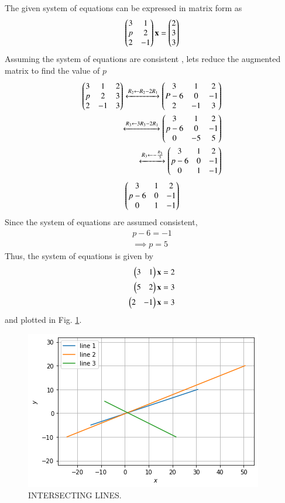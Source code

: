 The given  system of equations can be expressed in matrix form as 
\begin{align}
\begin{pmatrix}3 & 1\\p & 2\\2 & -1\end{pmatrix} \mathbf{x} = \begin{pmatrix}2\\3\\3\end{pmatrix}
\end{align}
%
Assuming the system of equations are consistent , lets reduce the augmented matrix to find the value of $p$
\begin{align}
    \begin{pmatrix}3 & 1 & 2\\p & 2 & 3\\2 &-1 & 3\end{pmatrix} 
\xleftrightarrow {R_2\leftarrow R_2 -2 R_1} \begin{pmatrix}3& 1 & 2\\P-6 & 0 & -1\\2 & -1 &3\end{pmatrix} 
\\
\xleftrightarrow {R_3\leftarrow 3R_3 -2 R_1}\begin{pmatrix}3 & 1 & 2 \\p-6 & 0 & -1\\0 & -5 & 5\end{pmatrix}
\\
\xleftrightarrow {R_3\leftarrow -\frac{R_3}{5}}\begin{pmatrix}3 & 1 & 2 \\p-6 & 0 & -1\\0 & 1& -1\end{pmatrix}
\end{align}
\begin{align}
 \begin{pmatrix}3 & 1 & 2\\p-6 & 0 & -1\\0 & 1 & -1\end{pmatrix} 
\end{align}
%
Since the system of equations are assumed consistent, 
%
\begin{align}
 p-6 = -1
\\
\implies p = 5
\end{align}
Thus, the system of equations is given by 
\begin{align}
 \begin{pmatrix}3 & 1\end{pmatrix}\mathbf{x}&=2 
\\
 \begin{pmatrix}5 & 2 \end{pmatrix}\mathbf{x}&=3 
\\
 \begin{pmatrix}2 & -1\end{pmatrix}\mathbf{x}&=3    
\end{align}
and plotted in Fig.     \ref{linform/20/fig:INTERSECTING LINES.}.
%
\begin{figure}[ht!]
    \centering
    \includegraphics[width=\columnwidth]{solutions/su2021/2/20/FIG-4.png}
    \caption{INTERSECTING LINES.}
    \label{linform/20/fig:INTERSECTING LINES.}
\end{figure} 


